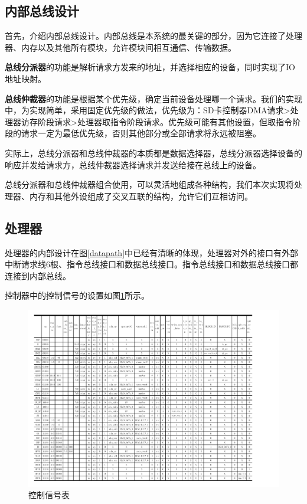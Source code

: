 \documentclass[11pt,utf8]{report}
\begin{document}
\subsection{内部总线设计}
	\par 首先，介绍内部总线设计。内部总线是本系统的最关键的部分，因为它连接了处理器、内存以及其他所有模块，允许模块间相互通信、传输数据。
	\par \textbf{总线分派器}的功能是解析请求方发来的地址，并选择相应的设备，同时实现了IO地址映射。
	\par \textbf{总线仲裁器}的功能是根据某个优先级，确定当前设备处理哪一个请求。我们的实现中，为实现简单，采用固定优先级的做法，优先级为：SD卡控制器DMA请求>处理器访存阶段请求>处理器取指令阶段请求。优先级可能有其他设置，但取指令阶段的请求一定为最低优先级，否则其他部分或全部请求将永远被阻塞。
	\par 实际上，总线分派器和总线仲裁器的本质都是数据选择器，总线分派器选择设备的响应并发给请求方，总线仲裁器选择请求并发送给接在总线上的设备。
	\par 总线分派器和总线仲裁器组合使用，可以灵活地组成各种结构，我们本次实现将处理器、内存和其他外设组成了交叉互联的结构，允许它们互相访问。

\subsection{处理器}
	\par 处理器的内部设计在图\ref{datapath}中已经有清晰的体现，处理器对外的接口有外部中断请求线6根、指令总线接口和数据总线接口。指令总线接口和数据总线接口都连接到内部总线。
	
	\par 控制器中的控制信号的设置如图\ref{control}所示。	
	
	\begin{center}
	\begin{figure}[h]
			\centering
			\setlength{\leftskip}{-40pt}
			\includegraphics[width=1.2\textwidth]{control.pdf}
			\caption{控制信号表}
			\label{control}
		\end{figure}
	\end{center}
\end{document}

